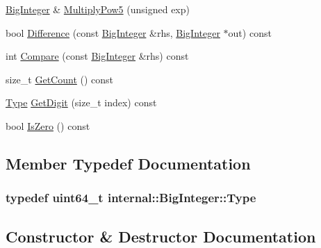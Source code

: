 \begin{DoxyCompactItemize}
\hyperlink{classinternal_1_1BigInteger}{Big\+Integer} \& \hyperlink{classinternal_1_1BigInteger_a98a13f169c27d1acfa57054f37c61763}{Multiply\+Pow5} (unsigned exp)
\item 
bool \hyperlink{classinternal_1_1BigInteger_a5741304ce36392adeef716e78b384b61}{Difference} (const \hyperlink{classinternal_1_1BigInteger}{Big\+Integer} \&rhs, \hyperlink{classinternal_1_1BigInteger}{Big\+Integer} $\ast$out) const 
\item 
int \hyperlink{classinternal_1_1BigInteger_afd8b15480df5003ee6b6e1b8ecbf5f45}{Compare} (const \hyperlink{classinternal_1_1BigInteger}{Big\+Integer} \&rhs) const 
\item 
size\+\_\+t \hyperlink{classinternal_1_1BigInteger_a720114cef0871c9f9c3c6a5f3a66e66a}{Get\+Count} () const 
\item 
\hyperlink{classinternal_1_1BigInteger_a1310812fca26ebae77594ba08678fc4c}{Type} \hyperlink{classinternal_1_1BigInteger_a92c6854f2388875374cfb9801bea0cc8}{Get\+Digit} (size\+\_\+t index) const 
\item 
bool \hyperlink{classinternal_1_1BigInteger_a99cf9cb87491a583c6b7614b0c8654fe}{Is\+Zero} () const 
\end{DoxyCompactItemize}


\subsection{Member Typedef Documentation}
\subsubsection[{\texorpdfstring{Type}{Type}}]{\setlength{\rightskip}{0pt plus 5cm}typedef {\bf uint64\+\_\+t} {\bf internal\+::\+Big\+Integer\+::\+Type}}\hypertarget{classinternal_1_1BigInteger_a1310812fca26ebae77594ba08678fc4c}{}\label{classinternal_1_1BigInteger_a1310812fca26ebae77594ba08678fc4c}


\subsection{Constructor \& Destructor Documentation}
